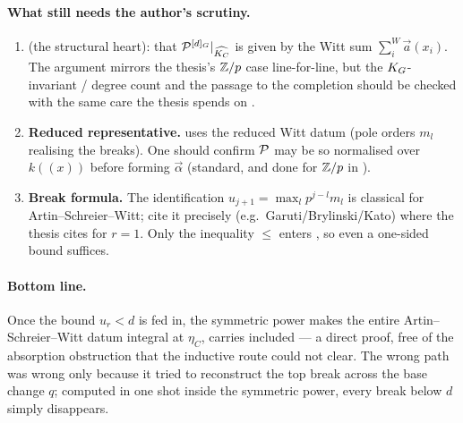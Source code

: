 \documentclass[11pt]{article}
\begin{document}
\paragraph{What still needs the author's scrutiny.}
\begin{enumerate}
  \item \textbf{} (the structural heart): that
        $\mathcal{P}^{[d]_G}|_{\widehat{K_C}}$ is given by the Witt sum
        $\sum_i^{W}\vec a(x_i)$. The argument mirrors the thesis's $\mathbb{Z}/p$ case
        line-for-line, but the $K_{G}$-invariant / degree count and the passage to
        the completion should be checked with the same care the thesis spends on
        .
  \item \textbf{Reduced representative.}  uses the reduced
        Witt datum (pole orders $m_l$ realising the breaks). One should confirm
        $\mathcal{P}$ may be so normalised over $k((x))$ before forming $\vec\alpha$
        (standard, and done for $\mathbb{Z}/p$ in \cite{Thomas2005}).
  \item \textbf{Break formula.} The identification
        $u_{j+1}=\max_l p^{j-l}m_l$ is classical for Artin--Schreier--Witt; cite
        it precisely (e.g.\ Garuti/Brylinski/Kato) where the thesis cites
        \cite{Thomas2005} for $r=1$. Only the inequality $\le$ enters
        , so even a one-sided bound suffices.
\end{enumerate}

\paragraph{Bottom line.}
Once the bound $u_r<d$ is fed in, the symmetric power makes the entire
Artin--Schreier--Witt datum integral at $\eta_C$, carries included --- a direct
proof, free of the absorption obstruction that the inductive route could not
clear. The wrong path was wrong only because it tried to reconstruct the top
break across the base change $q$; computed in one shot inside the symmetric
power, every break below $d$ simply disappears.

\printbibliography
\end{document}
